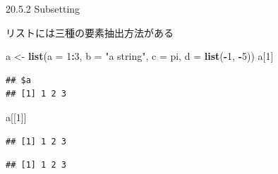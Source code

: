 \documentclass[ignorenonframetext,]{beamer}
\newenvironment{Shaded}{\begin{snugshade}}{\end{snugshade}}
\newcommand{\KeywordTok}[1]{\textcolor[rgb]{0.13,0.29,0.53}{\textbf{#1}}}
\newcommand{\DataTypeTok}[1]{\textcolor[rgb]{0.13,0.29,0.53}{#1}}
\newcommand{\DecValTok}[1]{\textcolor[rgb]{0.00,0.00,0.81}{#1}}
\newcommand{\StringTok}[1]{\textcolor[rgb]{0.31,0.60,0.02}{#1}}
\newcommand{\OperatorTok}[1]{\textcolor[rgb]{0.81,0.36,0.00}{\textbf{#1}}}
\newcommand{\NormalTok}[1]{#1}
\begin{document}
\begin{frame}[fragile]{20.5.2 Subsetting}

リストには三種の要素抽出方法がある

\begin{Shaded}
\begin{Highlighting}[]
\NormalTok{a <-}\StringTok{ }\KeywordTok{list}\NormalTok{(}\DataTypeTok{a =} \DecValTok{1}\OperatorTok{:}\DecValTok{3}\NormalTok{, }\DataTypeTok{b =} \StringTok{"a string"}\NormalTok{, }\DataTypeTok{c =}\NormalTok{ pi, }\DataTypeTok{d =} \KeywordTok{list}\NormalTok{(}\OperatorTok{-}\DecValTok{1}\NormalTok{, }\OperatorTok{-}\DecValTok{5}\NormalTok{))}
\NormalTok{a[}\DecValTok{1}\NormalTok{]}
\end{Highlighting}
\end{Shaded}

\begin{verbatim}
## $a
## [1] 1 2 3
\end{verbatim}

\begin{Shaded}
\begin{Highlighting}[]
\NormalTok{a[[}\DecValTok{1}\NormalTok{]]}
\end{Highlighting}
\end{Shaded}

\begin{verbatim}
## [1] 1 2 3
\end{verbatim}

\begin{Shaded}
\end{Shaded}

\begin{verbatim}
## [1] 1 2 3
\end{verbatim}

\end{frame}
\end{document}
